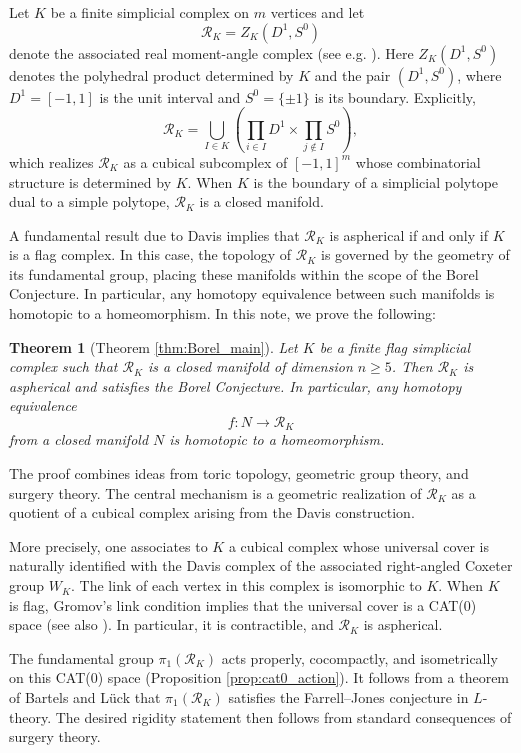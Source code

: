 \documentclass[11pt,a4paper]{article}
\numberwithin{equation}{section}
\newtheorem*{theorem}{Theorem}
\theoremstyle{named}
\begin{document}
Let $K$ be a finite simplicial complex on $m$ vertices and let
\[
\mathcal{R}_K = Z_K(D^1,S^0)
\]
denote the associated real moment-angle complex (see e.g. \cite{bbhg}). Here $Z_K(D^1,S^0)$ denotes the polyhedral product determined by $K$ and the pair $(D^1,S^0)$, where $D^1=[-1,1]$ is the unit interval and
$S^0=\{\pm 1\}$ is its boundary. Explicitly,
\[
\mathcal{R}_K =
\bigcup_{I \in K}
\left(
\prod_{i \in I} D^1 \times \prod_{j \notin I} S^0
\right),
\]
which realizes $\mathcal{R}_K$ as a cubical subcomplex of $[-1,1]^m$ whose combinatorial structure is determined by $K$. When $K$ is the boundary of a simplicial polytope dual to a simple polytope, $\mathcal{R}_K$ is a closed manifold.

A fundamental result due to Davis \cite{dav, rafca} implies that $\mathcal{R}_K$ is aspherical if and only if $K$ is a flag complex. In this case, the topology of $\mathcal{R}_K$ is governed by the geometry of its fundamental group, placing these manifolds within the scope of the Borel Conjecture. In particular, any homotopy equivalence between such manifolds is homotopic to a homeomorphism. In this note, we prove the following: 

\begin{theorem}[Theorem \ref{thm:Borel_main}]
Let $K$ be a finite flag simplicial complex such that $\mathcal{R}_K$ is a closed manifold of dimension $n \geq 5$. Then $\mathcal{R}_K$ is aspherical and satisfies the Borel Conjecture. In particular, any homotopy equivalence
\[
f \colon N \longrightarrow \mathcal{R}_K
\]
from a closed manifold $N$ is homotopic to a homeomorphism.
\end{theorem}

The proof combines ideas from toric topology, geometric group theory, and surgery theory. The central mechanism is a geometric realization of $\mathcal{R}_K$ as a quotient of a cubical complex arising from the Davis construction.

More precisely, one associates to $K$ a cubical complex whose universal cover is naturally identified with the Davis complex of the associated right-angled Coxeter group $W_K$. The link of each vertex in this complex is isomorphic to $K$. When $K$ is flag, Gromov's link condition \cite{gromov} implies that the universal cover is a CAT(0) space (see also \cite[p.212]{BridsonHaelfiger}). In particular, it is contractible, and $\mathcal{R}_K$ is aspherical.

The fundamental group $\pi_1(\mathcal{R}_K)$ acts properly, cocompactly, and isometrically on this CAT(0) space (Proposition \ref{prop:cat0_action}). It follows from a theorem of Bartels and L\"uck \cite{BartelsLuck2012} that $\pi_1(\mathcal{R}_K)$ satisfies the Farrell--Jones conjecture in $L$-theory. The desired rigidity statement then follows from standard consequences of surgery theory.
\end{document}
